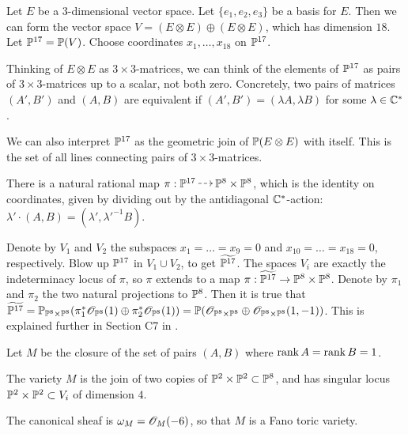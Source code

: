 Let $E$ be a 3-dimensional vector space. Let $\{e_1,e_2,e_3\}$ be a basis for $E$. Then we can form the vector space $V=(E \otimes E) \oplus (E \otimes E)$, which has dimension $18$. Let $\P^{17}=\P(V)$. Choose coordinates $x_1,\ldots,x_{18}$ on $\P^{17}$. 

Thinking of $E \otimes E$ as $3 \times 3$-matrices, we can think of the elements of $\P^{17}$ as pairs of $3 \times 3$-matrices up to a scalar, not both zero. Concretely, two pairs of matrices $(A',B')$ and $(A,B)$ are equivalent if $(A',B') = (\lambda A, \lambda B)$ for some $\lambda \in \C^\ast$.

We can also interpret $\P^{17}$ as the geometric join of $\P(E \otimes E)$ with itself. This is the set of all lines connecting pairs of $3 \times 3$-matrices.

There is a natural rational map $\pi:\P^{17} \rmap \P^8 \times \P^8$, which is the identity on coordinates, given by dividing out by the antidiagonal $\C^\ast$-action: $\lambda' \cdot (A,B) = (\lambda',{\lambda'}^{-1} B)$.

\begin{remark}
Denote by $V_1$ and $V_2$ the subspaces ${x_1=\ldots=x_9=0}$ and ${x_{10}=\ldots=x_{18}=0}$, respectively. Blow up $\P^{17}$ in $V_1 \cup V_2$, to get $\widetilde{\P^{17}}$. The spaces $V_i$ are exactly the indeterminacy locus of $\pi$, so $\pi$ extends to a map $\pi:\widetilde{\P^{17}} \to \P^8 \times \P^8$. Denote by $\pi_1$ and $\pi_2$ the two natural projections to $\P^8$. Then it is true that $\widetilde{\P^{17}}= \P_{\P^8 \times \P^8}(\pi_1^\ast \OO_{\P^8}(1) \oplus \pi_2^\ast \OO_{\P^8}(1))=\P(\OO_{\P^8\times \P^8} \oplus \OO_{\P^8 \times \P^8}(1,-1))$. This is explained further in Section C7 in \cite{altman_joins}.
\end{remark}

Let $M$ be the closure of the set of pairs $(A,B)$ where $\rank A = \rank B = 1$.  

\begin{proposition}
\label{prop:m}
The variety $M$ is the join of two copies of $\P^2 \times \P^2 \subset \P^8$, and has singular locus $\P^2 \times \P^2 \subset V_i$ of dimension $4$.

The canonical sheaf is $\omega_M = \OO_M(-6)$, so that $M$ is a Fano toric variety.
\end{proposition}

